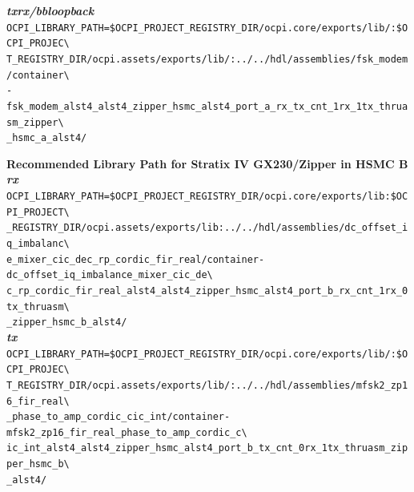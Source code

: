 \noindent\textbf{\textit{txrx/bbloopback}}\\
\verb|OCPI_LIBRARY_PATH=$OCPI_PROJECT_REGISTRY_DIR/ocpi.core/exports/lib/:$OCPI_PROJEC\| \\
\verb|T_REGISTRY_DIR/ocpi.assets/exports/lib/:../../hdl/assemblies/fsk_modem/container\| \\
\verb|-fsk_modem_alst4_alst4_zipper_hsmc_alst4_port_a_rx_tx_cnt_1rx_1tx_thruasm_zipper\| \\
\verb|_hsmc_a_alst4/| \\
\par\medskip

\noindent\textbf{Recommended Library Path for Stratix IV GX230/Zipper in HSMC B}\\

\noindent\textbf{\textit{rx}}\\
\verb|OCPI_LIBRARY_PATH=$OCPI_PROJECT_REGISTRY_DIR/ocpi.core/exports/lib:$OCPI_PROJECT\| \\
\verb|_REGISTRY_DIR/ocpi.assets/exports/lib:../../hdl/assemblies/dc_offset_iq_imbalanc\| \\
\verb|e_mixer_cic_dec_rp_cordic_fir_real/container-dc_offset_iq_imbalance_mixer_cic_de\| \\
\verb|c_rp_cordic_fir_real_alst4_alst4_zipper_hsmc_alst4_port_b_rx_cnt_1rx_0tx_thruasm\| \\
\verb|_zipper_hsmc_b_alst4/| \\

\noindent\textbf{\textit{tx}}\\
\verb|OCPI_LIBRARY_PATH=$OCPI_PROJECT_REGISTRY_DIR/ocpi.core/exports/lib/:$OCPI_PROJEC\| \\
\verb|T_REGISTRY_DIR/ocpi.assets/exports/lib/:../../hdl/assemblies/mfsk2_zp16_fir_real\| \\
\verb|_phase_to_amp_cordic_cic_int/container-mfsk2_zp16_fir_real_phase_to_amp_cordic_c\| \\
\verb|ic_int_alst4_alst4_zipper_hsmc_alst4_port_b_tx_cnt_0rx_1tx_thruasm_zipper_hsmc_b\| \\
\verb|_alst4/| \\

